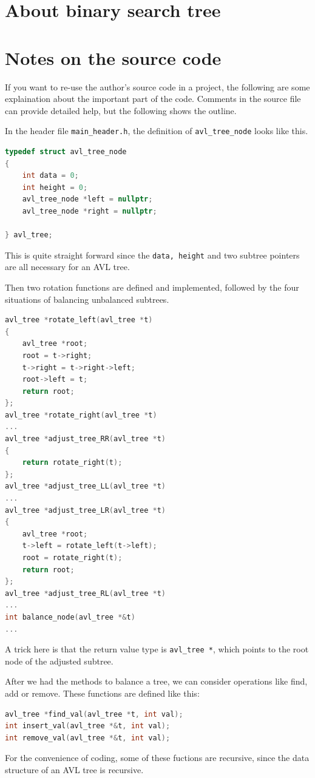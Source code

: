 \documentclass[cn,black,12pt,normal]{elegantnote}
\begin{document}
\section{About binary search tree}

\section{Notes on the source code}

If you want to re-use the author's source code in a project, the following are some explaination about the important part of the code. Comments in the source file can provide detailed help, but the following shows the outline.

In the header file \lstinline{main_header.h}, the definition of \lstinline{avl_tree_node} looks like this.
\begin{lstlisting}[language = C++]
typedef struct avl_tree_node
{
	int data = 0;
	int height = 0;
	avl_tree_node *left = nullptr;
	avl_tree_node *right = nullptr;

} avl_tree;
\end{lstlisting}
This is quite straight forward since the \lstinline{data, height} and two subtree pointers are all necessary for an AVL tree.

Then two rotation functions are defined and implemented, followed by the four situations of balancing unbalanced subtrees.
\begin{lstlisting}[language = C++]
avl_tree *rotate_left(avl_tree *t)
{
	avl_tree *root;
	root = t->right;
	t->right = t->right->left;
	root->left = t;
	return root;
};
avl_tree *rotate_right(avl_tree *t)
...
avl_tree *adjust_tree_RR(avl_tree *t)
{
	return rotate_right(t);
};
avl_tree *adjust_tree_LL(avl_tree *t)
...
avl_tree *adjust_tree_LR(avl_tree *t)
{
	avl_tree *root;
	t->left = rotate_left(t->left);
	root = rotate_right(t);
	return root;
};
avl_tree *adjust_tree_RL(avl_tree *t)
...
int balance_node(avl_tree *&t)
...
\end{lstlisting}
A trick here is that the return value type is \lstinline{avl_tree *}, which points to the root node of the adjusted subtree.

After we had the methods to balance a tree, we can consider operations like find, add or remove. These functions are defined like this:
\begin{lstlisting}[language = C++]
avl_tree *find_val(avl_tree *t, int val);
int insert_val(avl_tree *&t, int val);
int remove_val(avl_tree *&t, int val);
\end{lstlisting}
For the convenience of coding, some of these fuctions are recursive, since the data structure of an AVL tree is recursive.
\end{document}
